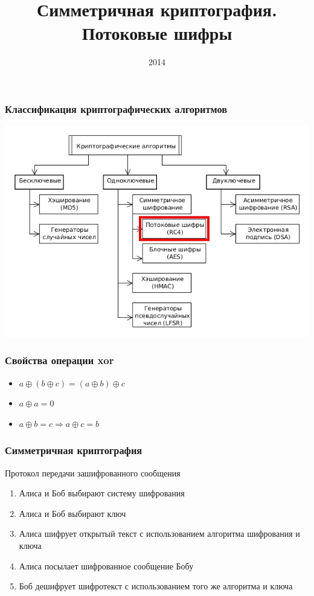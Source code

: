 \documentclass{beamer}
\title{Симметричная криптография. Потоковые шифры}
\institute{ВГУ}
\date{2014}
\begin{document}
\frame{\titlepage}

\begin{frame}
  \frametitle{Классификация криптографических алгоритмов}

  \includegraphics[width=\linewidth]{./imgs/CA_classification_stream.png}

\end{frame}

\begin{frame}
  \frametitle{Свойства операции xor}

  \begin{itemize}
    \item{$a \oplus (b \oplus c) = (a \oplus b) \oplus c$}
    \item{$a \oplus a = 0$}
    \item{$a \oplus b = c \Rightarrow a \oplus c = b$}
  \end{itemize}
\end{frame}


\begin{frame}
  \frametitle{Симметричная криптография}

  \begin{block}{Протокол передачи зашифрованного сообщения}
  \begin{enumerate}
    \item{Алиса и Боб выбирают систему шифрования}
    \item{Алиса и Боб выбирают ключ}
    \item{Алиса шифрует открытый текст с использованием алгоритма шифрования и ключа}
    \item{Алиса посылает шифрованное сообщение Бобу}
    \item{Боб дешифрует шифротекст с использованием того же алгоритма и ключа}
  \end{enumerate}
  \end{block}
\end{frame}
\end{document}
